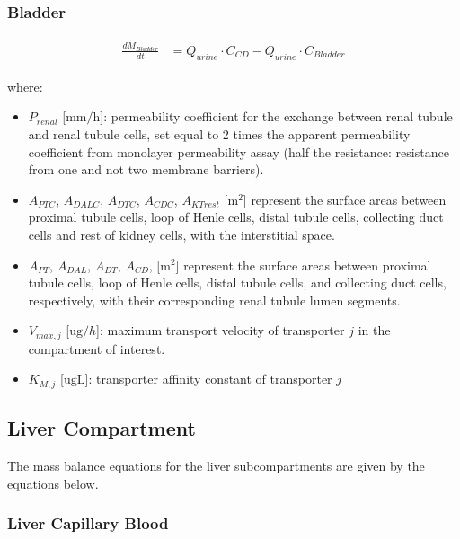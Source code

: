 \documentclass[preprint,12pt,authoryear]{elsarticle}
\begin{document}
\subsubsection{Bladder}

\begin{align}
\begin{aligned}
\frac{dM_{Bladder}}{dt} &= Q_{urine} \cdot C_{CD}
- Q_{urine} \cdot C_{Bladder}
\end{aligned}
\label{eq:PFOA_bladder}
\end{align}


\noindent
where:
\begin{itemize}
   
    \item $P_{renal}$ [$\text{mm}/\text{h}$]: permeability coefficient for the exchange between renal tubule and renal tubule cells, set equal to 2 times the apparent permeability coefficient from monolayer permeability assay (half the resistance: resistance from one and not two membrane barriers).
     \item $A_{PTC}$,  $A_{DALC}$, $A_{DTC}$,   $A_{CDC}$,  $A_{KTrest}$ [m$^2$] represent the surface areas between proximal tubule cells, loop of Henle cells, distal tubule cells, collecting duct cells and rest of kidney cells, with the interstitial space. 
    \item  $A_{PT}$,  $A_{DAL}$, $A_{DT}$,   $A_{CD}$, [m$^2$] represent the surface areas between proximal tubule cells, loop of Henle cells, distal tubule cells, and collecting duct cells, respectively, with their corresponding renal tubule lumen segments. 
    \item $V_{max,j}$ [$\text{ug}/h$]: maximum transport velocity of transporter $j$ in the compartment of interest.
    \item $K_{M,j}$ [$\text{ug}\text{L}$]: transporter affinity constant of transporter $j$

\end{itemize}


\subsection{Liver Compartment}

The mass balance equations for the liver subcompartments are given by the equations below.

\subsubsection{Liver Capillary Blood}
\end{document}
